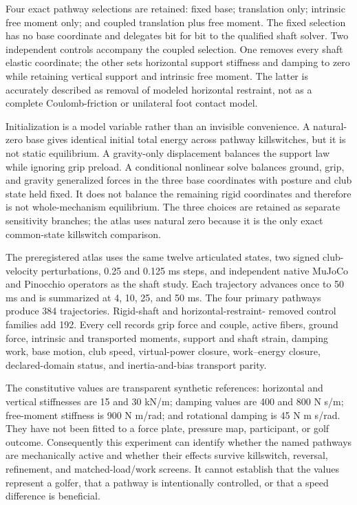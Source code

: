 \documentclass[
  letterpaper,
]{report}
\begin{document}
Four exact pathway selections are retained: fixed base; translation
only; intrinsic free moment only; and coupled translation plus free
moment. The fixed selection has no base coordinate and delegates bit for
bit to the qualified shaft solver. Two independent controls accompany
the coupled selection. One removes every shaft elastic coordinate; the
other sets horizontal support stiffness and damping to zero while
retaining vertical support and intrinsic free moment. The latter is
accurately described as removal of modeled horizontal restraint, not as
a complete Coulomb-friction or unilateral foot contact model.

Initialization is a model variable rather than an invisible convenience.
A natural-zero base gives identical initial total energy across pathway
killswitches, but it is not static equilibrium. A gravity-only
displacement balances the support law while ignoring grip preload. A
conditional nonlinear solve balances ground, grip, and gravity
generalized forces in the three base coordinates with posture and club
state held fixed. It does not balance the remaining rigid coordinates
and therefore is not whole-mechanism equilibrium. The three choices are
retained as separate sensitivity branches; the atlas uses natural zero
because it is the only exact common-state killswitch comparison.

The preregistered atlas uses the same twelve articulated states, two
signed club-velocity perturbations, 0.25 and 0.125 ms steps, and
independent native MuJoCo and Pinocchio operators as the shaft study.
Each trajectory advances once to 50 ms and is summarized at 4, 10, 25,
and 50 ms. The four primary pathways produce 384 trajectories.
Rigid-shaft and horizontal-restraint- removed control families add 192.
Every cell records grip force and couple, active fibers, ground force,
intrinsic and transported moments, support and shaft strain, damping
work, base motion, club speed, virtual-power closure, work--energy
closure, declared-domain status, and inertia-and-bias transport parity.

The constitutive values are transparent synthetic references: horizontal
and vertical stiffnesses are 15 and 30 kN/m; damping values are 400 and
800 N s/m; free-moment stiffness is 900 N m/rad; and rotational damping
is 45 N m s/rad. They have not been fitted to a force plate, pressure
map, participant, or golf outcome. Consequently this experiment can
identify whether the named pathways are mechanically active and whether
their effects survive killswitch, reversal, refinement, and
matched-load/work screens. It cannot establish that the values represent
a golfer, that a pathway is intentionally controlled, or that a speed
difference is beneficial.
\end{document}
